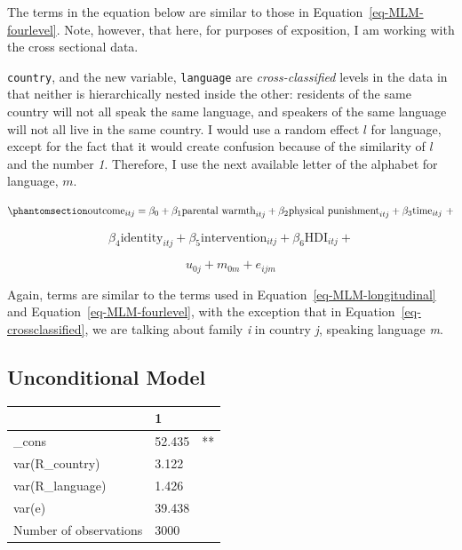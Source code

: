 \documentclass[
  letterpaper,
  DIV=11,
  numbers=noendperiod]{scrreprt}
\begin{document}
The terms in the equation below are similar to those in
Equation~\ref{eq-MLM-fourlevel}. Note, however, that here, for purposes
of exposition, I am working with the cross sectional data.

\texttt{country}, and the new variable, \texttt{language} are
\emph{cross-classified} levels in the data in that neither is
hierarchically nested inside the other: residents of the same country
will not all speak the same language, and speakers of the same language
will not all live in the same country. I would use a random effect \(l\)
for language, except for the fact that it would create confusion because
of the similarity of \(l\) and the number \emph{1}. Therefore, I use the
next available letter of the alphabet for language, \(m\).

\begin{equation}\phantomsection\label{eq-crossclassified}{\text{outcome}_{itj} = \beta_0 + \beta_1 \text{parental warmth}_{itj} + \beta_2 \text{physical punishment}_{itj} + \beta_3 \text{time}_{itj} \ + }\end{equation}

\[\beta_4 \text{identity}_{itj} + \beta_5 \text{intervention}_{itj} + \beta_6 \text{HDI}_{itj} +\]

\[u_{0j} + m_{0m} + e_{ijm}\]

Again, terms are similar to the terms used in
Equation~\ref{eq-MLM-longitudinal} and Equation~\ref{eq-MLM-fourlevel},
with the exception that in Equation~\ref{eq-crossclassified}, we are
talking about family \emph{i} in country \emph{j}, speaking language
\emph{m}.

\subsection{Unconditional Model}\label{unconditional-model-2}

\begin{longtable}[]{@{}lll@{}}
\toprule\noalign{}
& 1 & \\
\midrule\noalign{}
\endhead
\bottomrule\noalign{}
\endlastfoot
\_cons & 52.435 & ** \\
var(R\_country) & 3.122 & \\
var(R\_language) & 1.426 & \\
var(e) & 39.438 & \\
Number of observations & 3000 & \\
\end{longtable}
\end{document}
